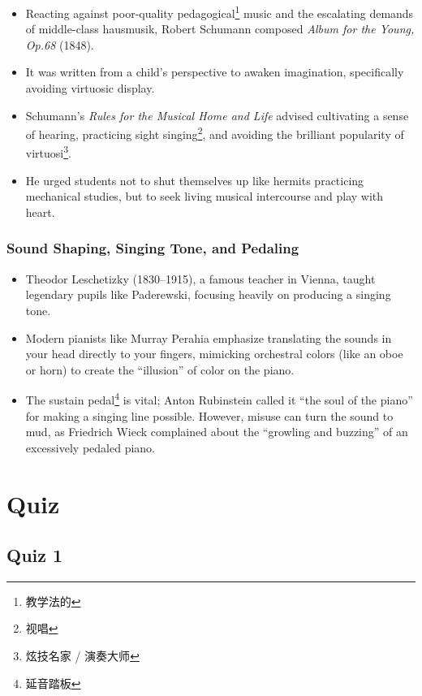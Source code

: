 \documentclass[math,code]{amznotes}
\theoremstyle{remark}
\begin{document}
\begin{itemize}
    \item Reacting against poor-quality pedagogical\footnote{教学法的} music and the escalating demands of middle-class hausmusik, Robert Schumann composed \textit{Album for the Young, Op.68} (1848).
    \item It was written from a child's perspective to awaken imagination, specifically avoiding virtuosic display.
    \item Schumann's \textit{Rules for the Musical Home and Life} advised cultivating a sense of hearing, practicing sight singing\footnote{视唱}, and avoiding the brilliant popularity of virtuosi\footnote{炫技名家 / 演奏大师}.
    \item He urged students not to shut themselves up like hermits practicing mechanical studies, but to seek living musical intercourse and play with heart.
\end{itemize}

\subsection{Sound Shaping, Singing Tone, and Pedaling}

\begin{itemize}
    \item Theodor Leschetizky (1830--1915), a famous teacher in Vienna, taught legendary pupils like Paderewski, focusing heavily on producing a singing tone.
    \item Modern pianists like Murray Perahia emphasize translating the sounds in your head directly to your fingers, mimicking orchestral colors (like an oboe or horn) to create the ``illusion'' of color on the piano.
    \item The sustain pedal\footnote{延音踏板} is vital; Anton Rubinstein called it ``the soul of the piano'' for making a singing line possible. However, misuse can turn the sound to mud, as Friedrich Wieck complained about the ``growling and buzzing'' of an excessively pedaled piano.
\end{itemize}

\chapter{Quiz}

\section{Quiz 1}
\end{document}
